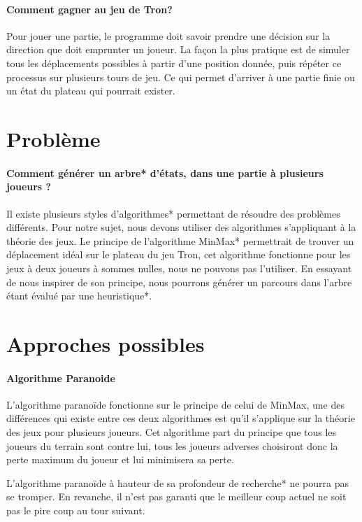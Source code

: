 	\paragraph{Comment gagner au jeu de Tron?}
	Pour jouer une partie, le programme doit savoir prendre une décision    sur la direction que doit emprunter un joueur. La façon la plus pratique est    de simuler tous les déplacements possibles à partir d'une position donnée,     puis répéter ce processus sur plusieurs tours de jeu. Ce qui permet d'arriver    à une partie finie ou un état du plateau qui pourrait exister. 
	
	
	\section{Problème}
	
	\paragraph{Comment générer un arbre* d'états, dans une partie à plusieurs joueurs ?}
	
	Il existe plusieurs styles d'algorithmes* permettant de résoudre des    problèmes différents. Pour notre sujet, nous devons utiliser des algorithmes     s'appliquant à la théorie des jeux. Le principe de l'algorithme MinMax*    permettrait de trouver un déplacement idéal sur le plateau du jeu Tron, cet    algorithme fonctionne pour les jeux à deux joueurs à sommes nulles, nous ne    pouvons pas l'utiliser. En essayant de nous inspirer de son principe, nous    pourrons générer un parcours dans l'arbre étant évalué par une heuristique*.  
	
	
	\section{Approches possibles}
	\paragraph{Algorithme Paranoide}
	L'algorithme paranoïde fonctionne sur le principe de celui de MinMax,     une des différences qui existe entre ces deux algorithmes est qu'il     s'applique sur la théorie des jeux pour plusieurs joueurs. Cet     algorithme part du principe que tous les joueurs du terrain sont     contre lui, tous les joueurs adverses choisiront donc la perte      maximum du joueur et lui minimisera sa perte. 
	
	L'algorithme paranoïde à hauteur de sa profondeur de recherche* ne     pourra pas se tromper. En revanche, il n'est pas garanti que le meilleur coup actuel ne soit pas le pire coup au tour suivant.  
	
